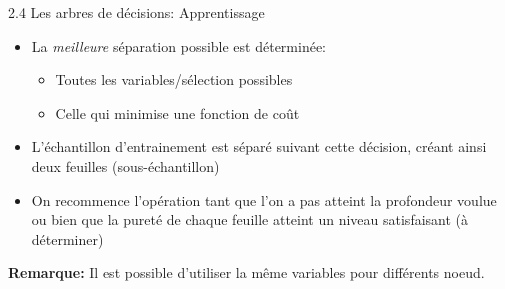 \begin{frame}{2.4 Les arbres de décisions: Apprentissage}
  \begin{itemize}
  \item La \textit{meilleure} séparation possible est déterminée:
    \begin{itemize}
      \normalsize
    \item Toutes les variables/sélection possibles
    \item Celle qui minimise une fonction de coût
    \end{itemize}
  \item L'échantillon d'entrainement est séparé suivant cette décision, créant ainsi deux feuilles (sous-échantillon)
  \item On recommence l'opération tant que l'on a pas atteint la profondeur voulue ou bien que la pureté de chaque feuille atteint un niveau satisfaisant (à déterminer)
  \end{itemize}
  \vspace{1cm}
  \textbf{Remarque:} Il est possible d'utiliser la même variables pour différents noeud.
\end{frame}

